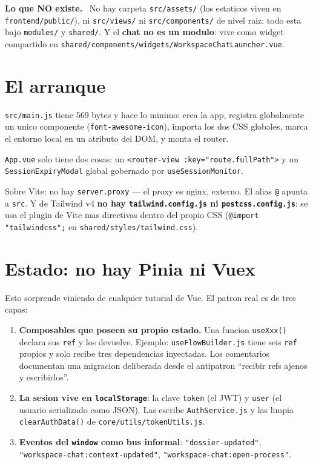 \documentclass[11pt,a4paper,oneside]{report}
\newenvironment{nota}[1][Nota]{%
  \par\medskip
  \colorlet{shadecolor}{black!6}%
  \begin{shaded}\noindent\textbf{#1.}\ \ignorespaces}%
  {\end{shaded}\par\medskip}
\newcommand{\rt}[1]{\texttt{#1}}
\begin{document}
\begin{nota}[Lo que NO existe]
No hay carpeta \rt{src/assets/} (los estaticos viven en \rt{frontend/public/}), ni
\rt{src/views/} ni \rt{src/components/} de nivel raiz: todo esta bajo \rt{modules/} y
\rt{shared/}. Y el \textbf{chat no es un modulo}: vive como widget compartido en
\rt{shared/components/widgets/WorkspaceChatLauncher.vue}.
\end{nota}

\section{El arranque}

\rt{src/main.js} tiene 569 bytes y hace lo minimo: crea la app, registra globalmente un unico
componente (\rt{font-awesome-icon}), importa los dos CSS globales, marca el entorno local en un
atributo del DOM, y monta el router.

\rt{App.vue} solo tiene dos cosas: un \rt{<router-view :key="route.fullPath">} y un
\rt{SessionExpiryModal} global gobernado por \rt{useSessionMonitor}.

Sobre Vite: no hay \rt{server.proxy} --- el proxy es nginx, externo. El alias \rt{@} apunta a
\rt{src}. Y de Tailwind v4 \textbf{no hay \rt{tailwind.config.js} ni \rt{postcss.config.js}}: se
usa el plugin de Vite mas directivas dentro del propio CSS
(\rt{@import "tailwindcss";} en \rt{shared/styles/tailwind.css}).

\section{Estado: no hay Pinia ni Vuex}

Esto sorprende viniendo de cualquier tutorial de Vue. El patron real es de tres capas:

\begin{enumerate}[leftmargin=1.6em]
  \item \textbf{Composables que poseen su propio estado.} Una funcion \rt{useXxx()} declara sus
        \rt{ref} y los devuelve. Ejemplo: \rt{useFlowBuilder.js} tiene seis \rt{ref} propios y
        solo recibe tres dependencias inyectadas. Los comentarios documentan una migracion
        deliberada desde el antipatron ``recibir refs ajenos y escribirlos''.
  \item \textbf{La sesion vive en \rt{localStorage}}: la clave \rt{token} (el JWT) y \rt{user}
        (el usuario serializado como JSON). Las escribe \rt{AuthService.js} y las limpia
        \rt{clearAuthData()} de \rt{core/utils/tokenUtils.js}.
  \item \textbf{Eventos del \rt{window} como bus informal}: \rt{"dossier-updated"},
        \rt{"workspace-chat:context-updated"}, \rt{"workspace-chat:open-process"}.
\end{enumerate}
\end{document}
